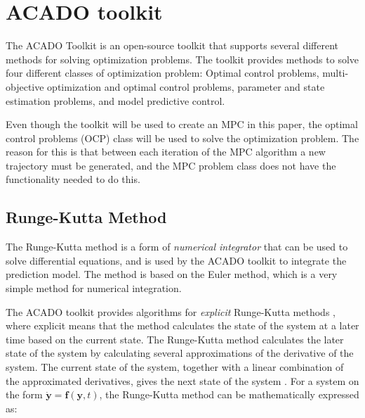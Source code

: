 \section{ACADO toolkit}

The ACADO Toolkit \cite{acadoHOUSKA} is an open-source toolkit that supports several different methods for solving optimization problems. The toolkit provides methods to solve four different classes of optimization problem: Optimal control problems, multi-objective optimization and optimal control problems, parameter and state estimation problems, and model predictive control.

Even though the toolkit will be used to create an MPC in this paper, the optimal control problems (OCP) class will be used to solve the optimization problem. The reason for this is that between each iteration of the MPC algorithm a new trajectory must be generated, and the MPC problem class does not have the functionality needed to do this.



\subsection{Runge-Kutta Method}

The Runge-Kutta method is a form of \textit{numerical integrator} that can be used to solve differential equations, and is used by the ACADO toolkit to integrate the prediction model. The method is based on the Euler method, which is a very simple method for numerical integration.

The ACADO toolkit provides algorithms for \textit{explicit} Runge-Kutta methods \cite{acadoHOUSKA}, where explicit means that the method calculates the state of the system at a later time based on the current state. The Runge-Kutta method calculates the later state of the system by calculating several approximations of the derivative of the system. The current state of the system, together with a linear combination of the approximated derivatives, gives the next state of the system \cite{modsimEGELAND}. For a system on the form $\mathbf{\dot{y}} = \mathbf{f}(\mathbf{y},t)$, the Runge-Kutta method can be mathematically expressed as:

